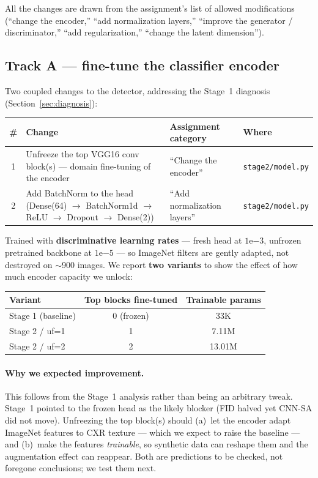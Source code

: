 \documentclass[11pt]{article}
\newcommand{\code}[1]{\texttt{#1}}
\begin{document}
All the changes are drawn from the assignment's list of allowed modifications
(``change the encoder,'' ``add normalization layers,'' ``improve the generator /
discriminator,'' ``add regularization,'' ``change the latent dimension'').

\subsection{Track A --- fine-tune the classifier encoder}
\label{sec:trackA}
Two coupled changes to the detector, addressing the Stage~1 diagnosis
(Section~\ref{sec:diagnosis}):

\begin{table}[htbp]
\centering\small
\begin{tabular}{@{}clp{3.2cm}l@{}}
\toprule
\# & \textbf{Change} & \textbf{Assignment category} & \textbf{Where} \\
\midrule
1 & Unfreeze the top VGG16 conv block(s) --- domain fine-tuning of the encoder & ``Change the encoder'' & \code{stage2/model.py} \\
2 & Add BatchNorm to the head (Dense(64) $\rightarrow$ BatchNorm1d $\rightarrow$ ReLU $\rightarrow$ Dropout $\rightarrow$ Dense(2)) & ``Add normalization layers'' & \code{stage2/model.py} \\
\bottomrule
\end{tabular}
\end{table}

Trained with \textbf{discriminative learning rates} --- fresh head at
$1\mathrm{e}{-3}$, unfrozen pretrained backbone at $1\mathrm{e}{-5}$ --- so
ImageNet filters are gently adapted, not destroyed on $\sim$900 images. We report
\textbf{two variants} to show the effect of how much encoder capacity we unlock:

\begin{table}[htbp]
\centering
\begin{tabular}{@{}lcc@{}}
\toprule
\textbf{Variant} & \textbf{Top blocks fine-tuned} & \textbf{Trainable params} \\
\midrule
Stage 1 (baseline) & 0 (frozen) & 33K \\
Stage 2 / uf=1 & 1 & 7.11M \\
Stage 2 / uf=2 & 2 & 13.01M \\
\bottomrule
\end{tabular}
\end{table}

\paragraph{Why we expected improvement.} This follows from the Stage~1 analysis
rather than being an arbitrary tweak. Stage~1 pointed to the frozen head as the
likely blocker (FID halved yet CNN-SA did not move). Unfreezing the top block(s)
should (a)~let the encoder adapt ImageNet features to CXR texture --- which we
expect to raise the baseline --- and (b)~make the features \emph{trainable}, so
synthetic data can reshape them and the augmentation effect can reappear. Both are
predictions to be checked, not foregone conclusions; we test them next.
\end{document}
